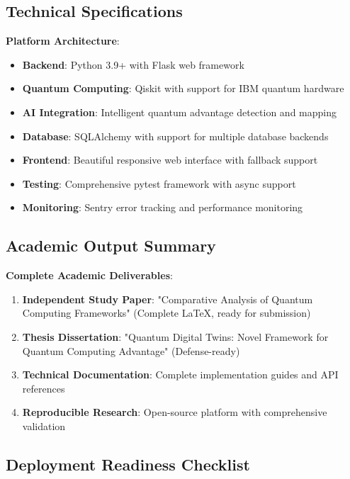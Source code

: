 \documentclass[12pt,a4paper]{article}
\begin{document}
\subsection{Technical Specifications}

\textbf{Platform Architecture}:
\begin{itemize}
    \item \textbf{Backend}: Python 3.9+ with Flask web framework
    \item \textbf{Quantum Computing}: Qiskit with support for IBM quantum hardware
    \item \textbf{AI Integration}: Intelligent quantum advantage detection and mapping
    \item \textbf{Database}: SQLAlchemy with support for multiple database backends
    \item \textbf{Frontend}: Beautiful responsive web interface with fallback support
    \item \textbf{Testing}: Comprehensive pytest framework with async support
    \item \textbf{Monitoring}: Sentry error tracking and performance monitoring
\end{itemize}

\subsection{Academic Output Summary}

\textbf{Complete Academic Deliverables}:
\begin{enumerate}
    \item \textbf{Independent Study Paper}: "Comparative Analysis of Quantum Computing Frameworks" (Complete LaTeX, ready for submission)
    \item \textbf{Thesis Dissertation}: "Quantum Digital Twins: Novel Framework for Quantum Computing Advantage" (Defense-ready)
    \item \textbf{Technical Documentation}: Complete implementation guides and API references
    \item \textbf{Reproducible Research}: Open-source platform with comprehensive validation
\end{enumerate}

\subsection{Deployment Readiness Checklist}
\end{document}
